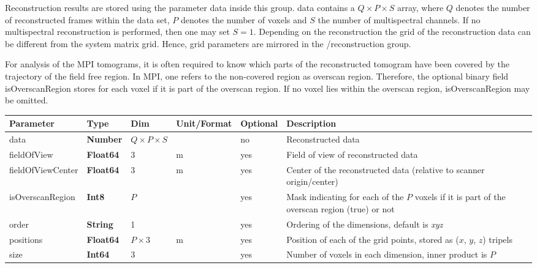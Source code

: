 \documentclass[landscape,a4paper]{article} %
\newcommand{\inltab}[1]{{\ttfamily\bfseries\color{blue}#1}}
\newcommand{\inlvar}[1]{{\ttfamily#1}}
\begin{document}
\begin{multicols}{2}
Reconstruction results are stored using the parameter \inlvar{data} inside this group. \inlvar{data} contains a $Q\times P \times S$ array, where $Q$ denotes the number of reconstructed frames within the data set, $P$ denotes the number of voxels and $S$ the number of multispectral channels. If no multispectral reconstruction is performed, then one may set $S=1$. Depending on the reconstruction the grid of the reconstruction data can be different from the system matrix grid. Hence, grid parameters are mirrored in the \inlvar{/reconstruction} group.

For analysis of the MPI tomograms, it is often required to know which parts of the reconstructed tomogram have been covered by the trajectory of the field free region. In MPI, one refers to the non-covered region as overscan region. Therefore, the optional binary field \inlvar{isOverscanRegion} stores for each voxel if it is part of the overscan region. If no voxel lies within the overscan region, \inlvar{isOverscanRegion} may be omitted.
\end{multicols}

\setlength\extrarowheight{5pt}
\noindent \begin{tabularx}{\columnwidth}{lllllX} 
\textbf{Parameter} & \textbf{Type} & \textbf{Dim} & \textbf{Unit/Format} & \textbf{Optional} & \textbf{Description} \\ \hline 
\inlvar{data} & \inltab{Number} & $Q\times P \times S$ & & no & Reconstructed data \\ \hline
\inlvar{fieldOfView} & \inltab{Float64} & $3$ & m & yes & Field of view of reconstructed data \\ \hline
\inlvar{fieldOfViewCenter} & \inltab{Float64} & $3$ & m & yes & Center of the reconstructed data (relative to scanner origin/center) \\ \hline 
\inlvar{isOverscanRegion} & \inltab{Int8} & $P$ &  & yes & Mask indicating for each of the $P$ voxels if it is part of the overscan region (true) or not \\ \hline
\inlvar{order} & \inltab{String} & 1 & & yes & Ordering of the dimensions, default is \textit{xyz} \\ \hline
\inlvar{positions} & \inltab{Float64} & $P \times 3$ & m & yes & Position of each of the grid points, stored as ($x$, $y$, $z$) tripels \\ \hline
\inlvar{size} & \inltab{Int64} & $3$ &  & yes & Number of voxels in each dimension, inner product is $P$ \\ \hline
\end{tabularx}
\setlength\extrarowheight{0pt}
\end{document}
